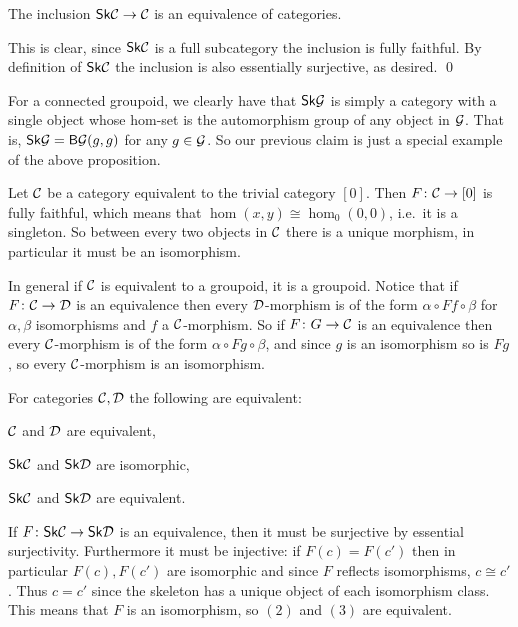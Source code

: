 \bprop

    The inclusion ${\sf Sk}{{\cal C}}\to{{\cal C}}$ is an equivalence of categories.

\eprop

\bproof

    This is clear, since ${\sf Sk}{{\cal C}}$ is a full subcategory the inclusion is fully faithful.
    By definition of ${\sf Sk}{{\cal C}}$ the inclusion is also essentially surjective, as desired.
    \qed

\eproof

For a connected groupoid, we clearly have that ${\sf Sk}{\cal G}$ is simply a category with a single object whose hom-set is the automorphism group of any object in ${\cal G}$.
That is, ${\sf Sk}{\cal G}={\sf B}{\cal G}(g,g)$ for any $g\in{\cal G}$.
So our previous claim is just a special example of the above proposition.

\bexam

    Let ${{\cal C}}$ be a category equivalent to the trivial category $[0]$.
    Then $F\colon{{\cal C}}\to[0]$ is fully faithful, which means that $\hom(x,y)\cong\hom_0(0,0)$, i.e.\ it is a singleton.
    So between every two objects in ${{\cal C}}$ there is a unique morphism, in particular it must be an isomorphism.

    In general if ${{\cal C}}$ is equivalent to a groupoid, it is a groupoid.
    Notice that if $F\colon{{\cal C}}\to{{\cal D}}$ is an equivalence then every ${{\cal D}}$-morphism is of the form $\alpha\circ Ff\circ\beta$ for $\alpha,\beta$ isomorphisms and $f$ a ${{\cal C}}$-morphism.
    So if $F\colon G\to{{\cal C}}$ is an equivalence then every ${{\cal C}}$-morphism is of the form $\alpha\circ Fg\circ\beta$, and since $g$ is an isomorphism so is $Fg$, so every ${{\cal C}}$-morphism is an isomorphism.

\eexam

\bprop

    For categories ${{\cal C}},{{\cal D}}$ the following are equivalent:
    \benum
        \item ${{\cal C}}$ and ${{\cal D}}$ are equivalent,
        \item ${\sf Sk}{{\cal C}}$ and ${\sf Sk}{{\cal D}}$ are isomorphic,
        \item ${\sf Sk}{{\cal C}}$ and ${\sf Sk}{{\cal D}}$ are equivalent.
    \eenum

\eprop

\bproof

    If $F\colon{\sf Sk}{{\cal C}}\to{\sf Sk}{{\cal D}}$ is an equivalence, then it must be surjective by essential surjectivity.
    Furthermore it must be injective: if $F(c)=F(c')$ then in particular $F(c),F(c')$ are isomorphic and since $F$ reflects isomorphisms, $c\cong c'$.
    Thus $c=c'$ since the skeleton has a unique object of each isomorphism class.
    This means that $F$ is an isomorphism, so $(2)$ and $(3)$ are equivalent.

